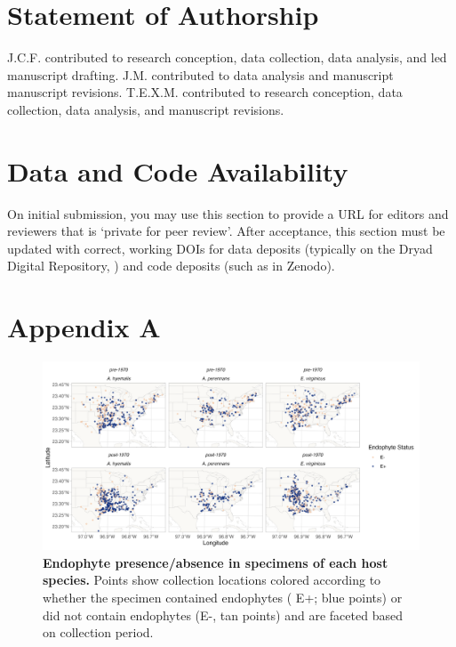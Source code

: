 \documentclass[11pt]{article}
\begin{document}
	
	\section*{Statement of Authorship}
J.C.F. contributed to research conception, data collection, data analysis, and led manuscript drafting.
J.M. contributed to data analysis and manuscript manuscript revisions.
T.E.X.M. contributed to research conception, data collection, data analysis, and manuscript revisions.

	
	\section*{Data and Code Availability}
	
	On initial submission, you may use this section to provide a URL for editors and reviewers that is `private for peer review'. After acceptance, this section must be updated with correct, working DOIs for data deposits (typically on the Dryad Digital Repository, ) and code deposits (such as in Zenodo). 
	
	\section*{Appendix A}
	\renewcommand{\thefigure}{A\arabic{figure}}
	\setcounter{figure}{0}
	
		\renewcommand{\thetable}{A\arabic{table}}
	\setcounter{equation}{0}  %
	\setcounter{figure}{0}
	\setcounter{table}{0}
	
	\begin{figure}[H]
		\centering
		\includegraphics[width = \linewidth]{../Plots/endo_status_map.png}
		\caption{\textbf{Endophyte presence/absence in specimens of each host species.} Points show collection locations colored according to whether the specimen contained endophytes ( E+; blue points) or did not contain endophytes (E-, tan points) and are faceted based on collection period.}
		\label{fig:endo_status_map}
	\end{figure}
	
\end{document}
